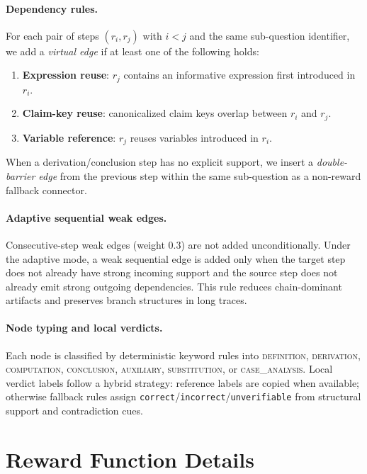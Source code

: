     \paragraph{Dependency rules.}
    For each pair of steps $(r_i, r_j)$ with $i<j$ and the same sub-question identifier, we add a \emph{virtual edge} if at least one of the following holds:
    \begin{enumerate}[leftmargin=*,itemsep=1pt]
        \item \textbf{Expression reuse}: $r_j$ contains an informative expression first introduced in $r_i$.
        \item \textbf{Claim-key reuse}: canonicalized claim keys overlap between $r_i$ and $r_j$.
        \item \textbf{Variable reference}: $r_j$ reuses variables introduced in $r_i$.
    \end{enumerate}
    When a derivation/conclusion step has no explicit support, we insert a \emph{double-barrier edge} from the previous step within the same sub-question as a non-reward fallback connector.
    
    \paragraph{Adaptive sequential weak edges.}
    Consecutive-step weak edges (weight 0.3) are not added unconditionally.
    Under the adaptive mode, a weak sequential edge is added only when the target step does not already have strong incoming support and the source step does not already emit strong outgoing dependencies.
    This rule reduces chain-dominant artifacts and preserves branch structures in long traces.
    
    \paragraph{Node typing and local verdicts.}
    Each node is classified by deterministic keyword rules into
    \textsc{definition}, \textsc{derivation}, \textsc{computation},
    \textsc{conclusion}, \textsc{auxiliary}, \textsc{substitution}, or
    \textsc{case\_analysis}.
    Local verdict labels follow a hybrid strategy: reference labels are copied when available; otherwise fallback rules assign
    \texttt{correct}/\texttt{incorrect}/\texttt{unverifiable} from structural support and contradiction cues.
    
    \section{Reward Function Details}
    \label{app:rewards}
    
